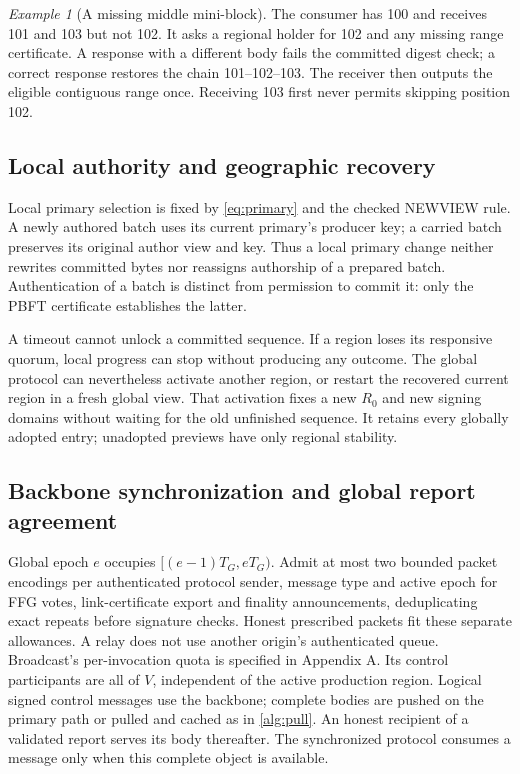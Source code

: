 \documentclass[11pt,a4paper,onecolumn]{article}
\theoremstyle{remark}\newtheorem{example}[definition]{Example}
\newcounter{protocol}
\begin{document}
\begin{example}[A missing middle mini-block]
The consumer has 100 and receives 101 and 103 but not 102. It asks a regional
holder for 102 and any missing range certificate. A response with a different
body fails the committed digest check; a correct response restores the chain
101--102--103. The receiver then outputs the eligible contiguous range once.
Receiving 103 first never permits skipping position 102.
\end{example}


\subsection{Local authority and geographic recovery}
Local primary selection is fixed by \eqref{eq:primary} and the checked
NEWVIEW rule. A newly authored batch uses its current primary's producer key;
a carried batch preserves its original author view and key. Thus a local
primary change neither rewrites committed bytes nor reassigns authorship of a
prepared batch. Authentication of a batch is distinct from permission to
commit it: only the PBFT certificate establishes the latter.

A timeout cannot unlock a committed sequence. If a region loses its responsive
quorum, local progress can stop without producing any outcome. The global
protocol can nevertheless activate another region, or restart the recovered
current region in a fresh global view. That activation fixes a new $R_0$ and
new signing domains without waiting for the old unfinished sequence. It retains
every globally adopted entry; unadopted previews have only regional stability.

\subsection{Backbone synchronization and global report agreement}\label{sec:global}
Global epoch $e$ occupies $[(e-1)T_G,eT_G)$. Admit at most two bounded packet
encodings per authenticated protocol sender, message type and active epoch for
FFG votes, link-certificate export and finality announcements, deduplicating
exact repeats before signature checks. Honest prescribed packets fit these
separate allowances. A relay does not use another origin's authenticated queue.
Broadcast's per-invocation quota is specified in Appendix A. Its control participants are all of
$V$, independent of the active production region. Logical signed control
messages use the backbone; complete bodies are pushed on the primary path or
pulled and cached as in \cref{alg:pull}. An honest recipient of a validated
report serves its body thereafter. The synchronized protocol consumes a message
only when this complete object is available.
\end{document}
